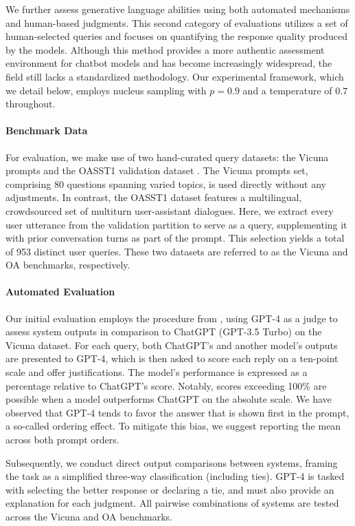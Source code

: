 We further assess generative language abilities using both automated mechanisms and human-based judgments. This second category of evaluations utilizes a set of human-selected queries and focuses on quantifying the response quality produced by the models. Although this method provides a more authentic assessment environment for chatbot models and has become increasingly widespread, the field still lacks a standardized methodology. Our experimental framework, which we detail below, employs nucleus sampling with $p=0.9$ and a temperature of $0.7$ throughout.

\paragraph{Benchmark Data} For evaluation, we make use of two hand-curated query datasets: the Vicuna prompts \citep{vicuna2023} and the OASST1 validation dataset \citep{kopf2023openassistant}. The Vicuna prompts set, comprising 80 questions spanning varied topics, is used directly without any adjustments. In contrast, the OASST1 dataset features a multilingual, crowdsourced set of multiturn user-assistant dialogues. Here, we extract every user utterance from the validation partition to serve as a query, supplementing it with prior conversation turns as part of the prompt. This selection yields a total of 953 distinct user queries. These two datasets are referred to as the Vicuna and OA benchmarks, respectively.

\paragraph{Automated Evaluation} Our initial evaluation employs the procedure from \citet{vicuna2023}, using GPT-4 as a judge to assess system outputs in comparison to ChatGPT (GPT-3.5 Turbo) on the Vicuna dataset. For each query, both ChatGPT’s and another model's outputs are presented to GPT-4, which is then asked to score each reply on a ten-point scale and offer justifications. The model’s performance is expressed as a percentage relative to ChatGPT’s score. Notably, scores exceeding 100\% are possible when a model outperforms ChatGPT on the absolute scale. We have observed that GPT-4 tends to favor the answer that is shown first in the prompt, a so-called ordering effect. To mitigate this bias, we suggest reporting the mean across both prompt orders.

Subsequently, we conduct direct output comparisons between systems, framing the task as a simplified three-way classification (including ties). GPT-4 is tasked with selecting the better response or declaring a tie, and must also provide an explanation for each judgment. All pairwise combinations of systems are tested across the Vicuna and OA benchmarks.

